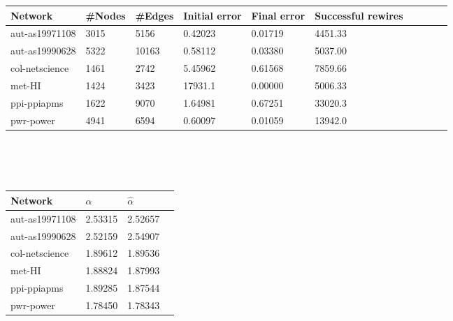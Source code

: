 \documentclass[12pt]{article}
\begin{document}
\begin{tabular}{|l|l|l||l|l|l|l|l|l|l|}
\hline
Network & \#Nodes & \#Edges & Initial error & Final error & Successful rewires\\\hline
aut-as19971108 & 3015 & 5156 & 0.42023& 0.01719 & 4451.33\\\hline
aut-as19990628 & 5322 & 10163 & 0.58112& 0.03380 & 5037.00\\\hline
col-netscience & 1461 & 2742 & 5.45962& 0.61568 & 7859.66\\\hline
met-HI & 1424 & 3423 & 17931.1& 0.00000 & 5006.33\\\hline
ppi-ppiapms & 1622 & 9070 & 1.64981& 0.67251 & 33020.3\\\hline
pwr-power & 4941 & 6594 & 0.60097& 0.01059 & 13942.0\\\hline
\end{tabular}
\\\\\\
\begin{tabular}{|l|l|l|l|}
\hline
Network & $\alpha$ & $\hat{\alpha}$\\\hline
aut-as19971108 & 2.53315 & 2.52657\\\hline
aut-as19990628 & 2.52159 & 2.54907\\\hline
col-netscience & 1.89612 & 1.89536 \\\hline
met-HI & 1.88824 &  1.87993\\\hline
ppi-ppiapms & 1.89285 & 1.87544 \\\hline
pwr-power & 1.78450 &  1.78343\\\hline
\end{tabular}
\end{document}
